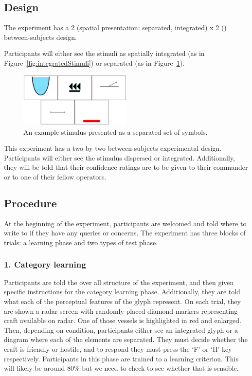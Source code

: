 \documentclass[doc, a4paper, apacite]{apa6}
\begin{document}
\subsection{Design}
The experiment has a 2 (spatial presentation: separated, integrated) x 2 () between-subjects design. 

Participants will either see the stimuli as spatially integrated (as in Figure~\ref{fig:integratedStimuli}) or separated (as in Figure~\ref{fig:separatedStimulus}). 

\begin{figure}
	\centering	
	\includegraphics[width=0.5\textwidth]{images/separatedStimulusExample}
	\caption{An example stimulus presented as a separated set of symbols.}
	\label{fig:separatedStimulus}	
\end{figure}

This experiment has a two by two between-subjects experimental design. 
Participants will either see the stimulus dispersed or integrated. 
Additionally, they will be told that their confidence ratings are to be given to their commander or to one of their fellow operators. 

\subsection{Procedure}
At the beginning of the experiment, participants are welcomed and told where to write to if they have any queries or concerns. 
The experiment has three blocks of trials: a learning phase and two types of test phase. 

\subsubsection{1. Category learning} 
Participants are told the over all structure of the experiment, and then given specific instructions for the category learning phase. 
Additionally, they are told what each of the perceptual features of the glyph represent. 
On each trial, they are shown a radar screen with randomly placed diamond markers representing craft available on radar. 
One of those vessels is highlighted in red and enlarged. 
Then, depending on condition, participants either see an integrated glyph or a diagram where each of the elements are separated. 
They must decide whether the craft is friendly or hostile, and to respond they must press the `F' or `H' key respectively. 
Participants in this phase are trained to a learning criterion. 
This will likely be around 80\% but we need to check to see whether that is sensible. 





\clearpage
\newpage


\end{document}
